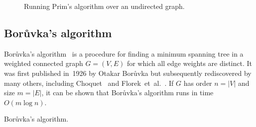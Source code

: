 \begin{figure}[!htbp]
\centering
{}

\caption{Running Prim's algorithm over an undirected graph.}
\label{fig:tree_forests:Prim_algorithm_undirected_graph}
\end{figure}



\subsection{Bor\r{u}vka's algorithm}
\label{subsec:trees_forests:Boruvka_algorithm}

Bor\r{u}vka's
algorithm~\cite{Boruvka1926a,Boruvka1926b}
is a procedure for finding a minimum
spanning tree in a weighted connected graph $G = (V,E)$ for which all
edge weights are distinct. It was first published in~1926 by Otakar
Bor\r{u}vka but subsequently rediscovered
by many others, including
Choquet~\cite{Choquet1938} and
Florek~et~al.~\cite{FlorekEtAl1951}.
If $G$ has order $n = |V|$ and size $m = |E|$, it can be shown that
Bor\r{u}vka's algorithm runs in time
$O(m \log n)$.

\begin{algorithm}[!htbp]

\caption{Bor\r{u}vka's algorithm.}
\label{alg:trees_forests:Boruvka}
\end{algorithm}

